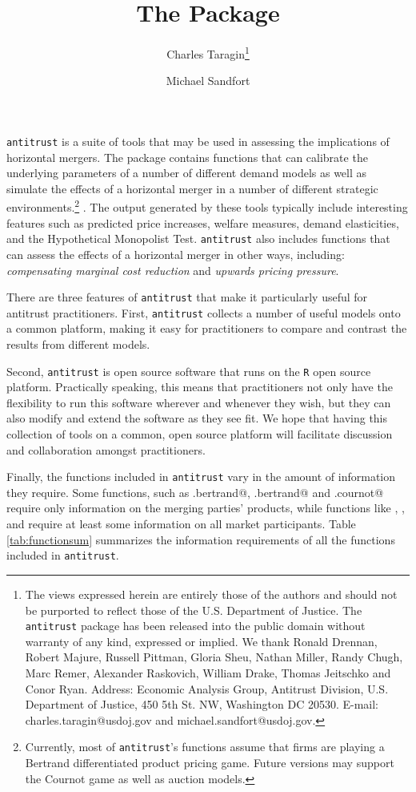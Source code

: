 \documentclass[11pt,numbers=noenddot,pointlessnumbers]{scrreprt}
\title{The \atr{} Package}
\author{Charles Taragin\footnote{The views expressed herein are entirely those of the authors and should not be purported to reflect those of the U.S. Department of Justice.  The \texttt{antitrust} package has been released into the
public domain without warranty of any kind, expressed or implied. We
thank Ronald Drennan, Robert Majure, Russell Pittman, Gloria Sheu,
Nathan Miller, Randy Chugh, Marc Remer, Alexander Raskovich, William Drake, Thomas
Jeitschko and Conor Ryan. Address: Economic Analysis Group, Antitrust Division, U.S. Department of Justice, 450 5th St. NW, Washington DC 20530.  E-mail: charles.taragin@usdoj.gov and michael.sandfort@usdoj.gov. } \and Michael Sandfort\samethanks}
\newcommand{\rlan}{{\tt R}}
\newcommand{\atr}{{\tt antitrust}}
\numberwithin{equation}{section}
\begin{document}
%

\maketitle


\tableofcontents
\newpage

\atr{} is a suite of tools that may be used in assessing the implications of horizontal mergers.  The package contains
functions that can calibrate the underlying parameters of a number
of different demand models as well as simulate the effects of a
horizontal merger in a number of different strategic
environments.\footnote{Currently, most of \atr{}'s functions assume
  that firms are playing a Bertrand differentiated product pricing
  game. Future versions may support the Cournot game as well as
  auction models.}
. The output generated by these tools typically include interesting
features such as predicted price increases, welfare measures, demand
elasticities, and the Hypothetical Monopolist Test.
\atr{} also includes functions that can assess the
effects of a horizontal merger in other ways, including:
\emph{compensating marginal cost reduction} and \emph{upwards pricing pressure}.

There are three features of \atr{} that make it particularly useful
for antitrust practitioners. First, \atr{} collects a number of useful models
onto a common platform, making it easy for
practitioners to compare and contrast the results from different
models.

Second, \atr{} is open source software that runs on the \rlan{} open source
platform. Practically speaking, this means that practitioners not only
have the flexibility to run this software wherever and whenever they
wish, but they can also modify and extend the software as they see
fit.  We hope that having this collection of tools on a common, open
source platform will facilitate discussion and collaboration amongst practitioners.


Finally, the functions included in \atr{} vary in the amount of information they require.  %
Some functions, such as \verb@upp.bertrand@, \verb@cmcr.bertrand@ and
\verb@cmcr.cournot@ require only information on the
merging parties' products, while functions like \verb@linear@,
\verb@pcaids@, and \verb@logit@ require at least some
information on all market participants. Table \ref{tab:functionsum}
summarizes the information requirements of all the functions included in \atr{}.
\end{document}
